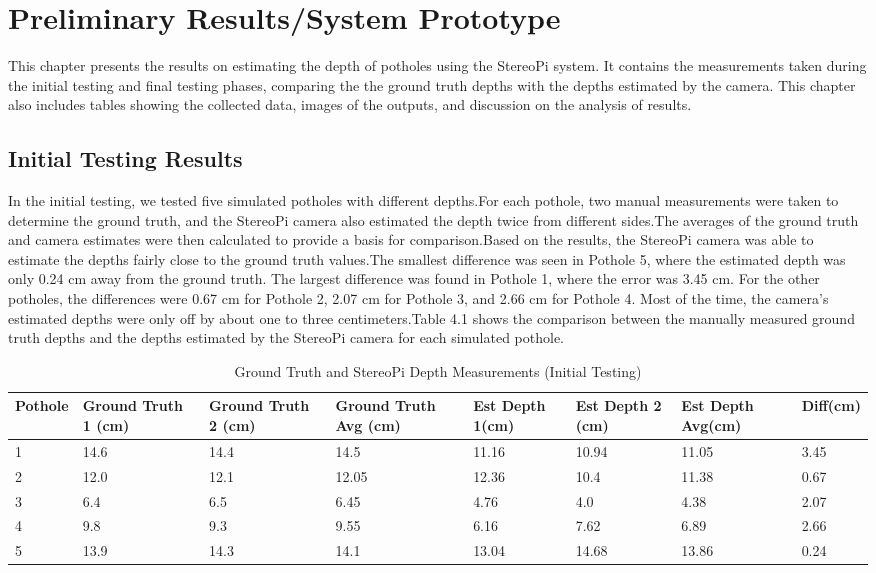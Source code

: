 \chapter{Preliminary Results/System Prototype}
This chapter presents the results on estimating the depth of potholes using the StereoPi system. It contains the measurements taken during the initial testing and final testing phases, comparing the the ground truth depths with the depths estimated by the camera. This chapter also includes tables showing the collected data, images of the outputs, and discussion on the analysis of results.

\section{\textbf{ Initial Testing Results} }
In the initial testing, we tested five simulated potholes with different depths.For each pothole, two manual measurements were taken to determine the ground truth, and the StereoPi camera also estimated the depth twice from different sides.The averages of the ground truth and camera estimates were then calculated to provide a basis for comparison.Based on the results, the StereoPi camera was able to estimate the depths fairly close to the ground truth values.The smallest difference was seen in Pothole 5, where the estimated depth was only 0.24 cm away from the ground truth. The largest difference was found in Pothole 1, where the error was 3.45 cm. For the other potholes, the differences were 0.67 cm for Pothole 2, 2.07 cm for Pothole 3, and 2.66 cm for Pothole 4. Most of the time, the camera’s estimated depths were only off by about one to three centimeters.Table 4.1 shows the comparison between the manually measured ground truth depths and the depths estimated by the StereoPi camera for each simulated pothole.

\begin{table}[h!]
	\centering
	\hspace{-2cm}
	\small 
	\caption{Ground Truth and StereoPi Depth Measurements (Initial Testing)}
	\begin{tabular}{|p{1.5cm}|p{1.5cm}|p{1.5cm}|p{1.5cm}|p{1.5cm}|p{1.5cm}|p{1.5cm}|p{1.5cm}|}
		\hline
		\textbf{Pothole} & \textbf{Ground Truth 1 (cm)} & \textbf{Ground Truth 2 (cm)} & \textbf{Ground Truth Avg (cm)} & \textbf{Est Depth 1(cm)} & \textbf{Est Depth 2 (cm)} & \textbf{Est Depth Avg(cm)} & \textbf{Diff(cm)} \\ \hline
		
		1 & 14.6 & 14.4 & 14.5 & 11.16 & 10.94 & 11.05 & 3.45  \\ \hline
		2 & 12.0 & 12.1 & 12.05 & 12.36 & 10.4 & 11.38 & 0.67 \\ \hline
		3 & 6.4 & 6.5 & 6.45 & 4.76 & 4.0 & 4.38 & 2.07 \\ \hline
		4 & 9.8 & 9.3 & 9.55 & 6.16 & 7.62 & 6.89 & 2.66 \\ \hline
		5 & 13.9 & 14.3 & 14.1 & 13.04 & 14.68 & 13.86 & 0.24 \\ \hline
		
	\end{tabular}
	\label{tab:comparison}
	\hspace{-3cm}
\end{table}

